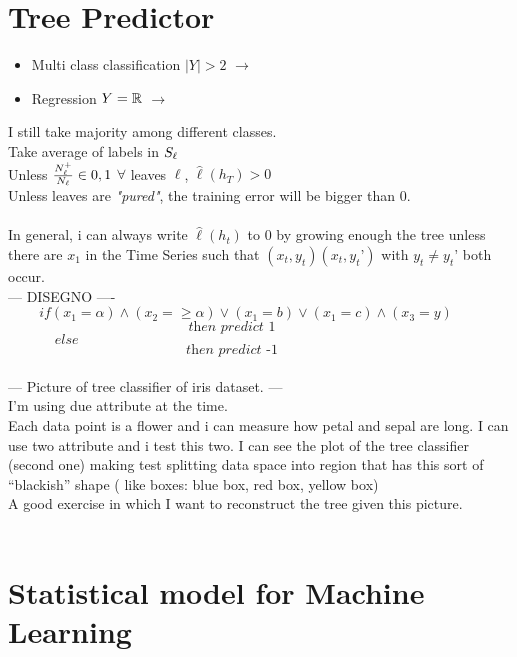 \documentclass[../main.tex]{subfiles}
\begin{document}
\section{Tree Predictor}
\begin{itemize}
\item Multi class classification $|Y| > 2$ $\longrightarrow$ 
\item Regression $Y = \mathbb{R} $ $\longrightarrow$ 
\end{itemize}
I still take majority among different classes.\\
Take average of labels in $S_{\ell}$
\\
Unless $\frac{N_{\ell}^+}{N_{\ell}} \in {0,1} $ \qquad $\forall$ leaves $\ell$, $\hat{\ell}(h_T) > 0$
\\
Unless leaves are \textit{"pured"}, the training error will be bigger than 0.
\\\\
In general, i can always write $\hat{\ell}(h_t)$ to 0 by growing enough the tree unless there are $x_1$ in the Time Series such that $(x_t, y_t)(x_t,y_t’)$ with $y_t \neq y_t’$ both occur.
\\
--- DISEGNO ----
\\
$$ if (x_1 = \alpha) \wedge (x_2 = \geq \alpha) \vee (x_1 = b) \vee (x_1 = c) \wedge (x_3= y) \qquad 
$$
$$
\textit{then predict 1} \qquad \qquad
$$
$
\qquad \quad \,\,else
$
$$
\textit{then predict -1} \qquad \qquad
$$
\\
--- Picture of tree classifier of iris dataset. ---\\
I’m using due attribute at the time.\\
Each data point is a flower and i can measure how petal and sepal are long.
I can use two attribute and i test this two. I can see the plot of the tree
classifier (second one) making test splitting data space into region that has
this sort of “blackish” shape ( like boxes: blue box, red box, yellow box)\\
A good exercise in which I want to reconstruct the tree given this picture.
\\\\
\section{Statistical model for Machine Learning}
\end{document}
